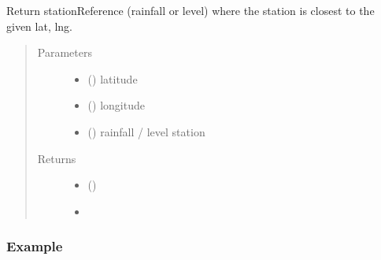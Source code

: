 \documentclass[letterpaper,10pt,english]{sphinxmanual}
\begin{document}
\begin{fulllineitems}
\label{\detokenize{index:flood_tool.get_closest_station_ref_by_type_from_lat_lng}}
\sphinxAtStartPar
Return stationReference (rainfall or level) where the station is
closest to the given lat, lng.
\begin{quote}\begin{description}
\item[{Parameters}] \leavevmode\begin{itemize}
\item {} 
\sphinxAtStartPar
{} () \textendash{} latitude

\item {} 
\sphinxAtStartPar
{} () \textendash{} longitude

\item {} 
\sphinxAtStartPar
{} () \textendash{} rainfall / level station

\end{itemize}

\item[{Returns}] \leavevmode
\sphinxAtStartPar
\begin{itemize}
\item {} 
\sphinxAtStartPar
{} ()

\item {} 
\sphinxAtStartPar
{}

\end{itemize}


\end{description}\end{quote}
\subsubsection*{Example}

\begin{sphinxVerbatim}[commandchars=\\\{\}]
   
\end{sphinxVerbatim}

\end{fulllineitems}
\end{document}
